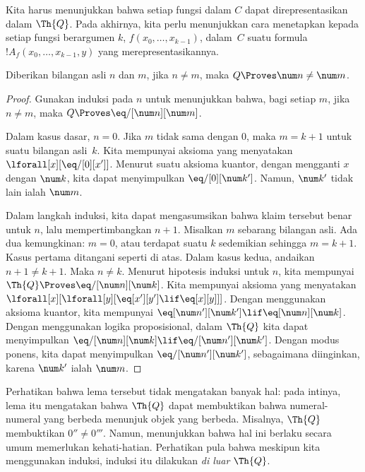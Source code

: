 \documentclass[../../../include/open-logic-section]{subfiles}
\begin{document}

Kita harus menunjukkan bahwa setiap fungsi dalam $C$ dapat direpresentasikan
dalam $\Th{Q}$. Pada akhirnya, kita perlu menunjukkan cara menetapkan kepada
setiap fungsi berargumen $k$, $f(x_0,\dots,x_{k-1})$, dalam~$C$ suatu formula
$!A_f(x_0,\dots,x_{k-1},y)$ yang merepresentasikannya.

\begin{lem}
Diberikan bilangan asli $n$ dan $m$, jika $n \neq m$, maka $Q \Proves \num
n \neq \num m$.
\end{lem}

\begin{proof}
Gunakan induksi pada $n$ untuk menunjukkan bahwa, bagi setiap $m$, jika
$n \neq m$, maka $Q \Proves \eq/[\num n][\num m]$.

Dalam kasus dasar, $n = 0$. Jika $m$ tidak sama dengan $0$, maka
$m = k + 1$ untuk suatu bilangan asli~$k$. Kita mempunyai aksioma yang
menyatakan $\lforall[x][\eq/[0][x']]$. Menurut suatu aksioma kuantor, dengan
mengganti $x$ dengan $\num k$, kita dapat menyimpulkan
$\eq/[0][\num k']$. Namun, $\num k'$ tidak lain ialah $\num m$.

Dalam langkah induksi, kita dapat mengasumsikan bahwa klaim tersebut benar
untuk $n$, lalu mempertimbangkan $n+1$. Misalkan $m$ sebarang bilangan asli.
Ada dua kemungkinan: $m = 0$, atau terdapat suatu $k$ sedemikian sehingga
$m = k+1$. Kasus pertama ditangani seperti di atas. Dalam kasus kedua,
andaikan $n+1 \neq k+1$. Maka $n \neq k$. Menurut hipotesis induksi untuk
$n$, kita mempunyai $\Th{Q} \Proves \eq/[\num n][\num k]$. Kita mempunyai
aksioma yang menyatakan
$\lforall[x][\lforall[y][\eq[x'][y'] \lif \eq[x][y]]]$. Dengan menggunakan
aksioma kuantor, kita mempunyai
$\eq[\num n'][\num k'] \lif \eq[\num n][\num k]$. Dengan menggunakan
logika proposisional, dalam $\Th{Q}$ kita dapat menyimpulkan
$\eq/[\num n][\num k] \lif \eq/[\num n'][\num k']$. Dengan modus ponens,
kita dapat menyimpulkan $\eq/[\num n'][\num k']$, sebagaimana diinginkan,
karena $\num k'$ ialah $\num m$.
\end{proof}

Perhatikan bahwa lema tersebut tidak mengatakan banyak hal: pada intinya,
lema itu mengatakan bahwa $\Th{Q}$ dapat membuktikan bahwa numeral-numeral
yang berbeda menunjuk objek yang berbeda. Misalnya, $\Th{Q}$ membuktikan
$0'' \neq 0'''$. Namun, menunjukkan bahwa hal ini berlaku secara umum
memerlukan kehati-hatian. Perhatikan pula bahwa meskipun kita menggunakan
induksi, induksi itu dilakukan \emph{di luar} $\Th{Q}$.
\end{document}
